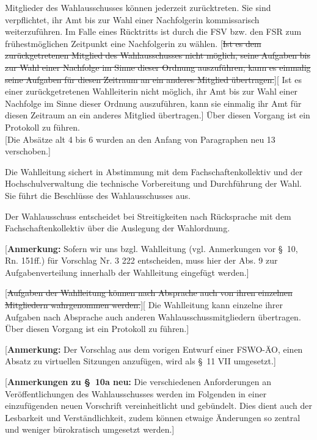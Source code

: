 \documentclass[%
draft,%
multilinesections%
]{fswo}
\newcommand\oldT[1]  {{\color{Gray}[\st{#1}]}}
\newcommand\newT[1]  {{\color{Green}[#1]}}
\newcommand\bemFr[1] {{\color{Red}[#1]}}
\newcommand\bemFe[1] {{\color{Cyan}[#1]}}
\newcommand\oldT[1]{}%
\newcommand\newT[1]{#1}
\newcommand\bemFr[1]{}%
\newcommand\bemFe[1]{}%
\newcommand\change[2]{\oldT{#1}\newT{#2}}
\begin{document}
\begin{contract}
Mitglieder des Wahlausschusses können jederzeit zurücktreten.
Sie sind verpflichtet, ihr Amt bis zur Wahl einer Nachfolgerin kommissarisch weiterzuführen.
Im Falle eines Rücktritts ist durch die FSV bzw. den FSR zum frühestmöglichen Zeitpunkt eine Nachfolgerin zu wählen.
\change{Ist es dem zurückgetretenen Mitglied des Wahlausschusses nicht möglich, seine Aufgaben bis zur Wahl einer Nachfolge im Sinne dieser Ordnung auszuführen, kann es einmalig seine Aufgaben für diesen Zeitraum an ein anderes Mitglied übertragen.}{%
Ist es einer zurückgetretenen Wahlleiterin nicht möglich, ihr Amt bis zur Wahl einer
Nachfolge im Sinne dieser Ordnung auszuführen, kann sie einmalig ihr Amt für diesen
Zeitraum an ein anderes Mitglied übertragen.}
Über diesen Vorgang ist ein Protokoll zu führen.
%
\\\bemFe{Die Absätze alt 4 bis 6 wurden an den Anfang von Paragraphen neu 13 verschoben.}

Die Wahlleitung sichert in Abstimmung mit dem Fachschaftenkollektiv und der Hochschulverwaltung die technische Vorbereitung und Durchführung der Wahl.
Sie führt die Beschlüsse des Wahlausschusses aus.

Der Wahlausschuss entscheidet bei Streitigkeiten nach Rücksprache mit dem Fachschaftenkollektiv über die Auslegung der Wahlordnung.
%
\begin{addmargin}{1cm}
\bemFr{\textbf{Anmerkung:} Sofern wir uns bzgl. Wahlleitung (vgl. Anmerkungen vor \S~10, Rn. 151ff.) für Vorschlag Nr. 3
222 entscheiden, muss hier der Abs. 9 zur Aufgabenverteilung innerhalb der Wahlleitung eingefügt werden.}
\end{addmargin}

\change{Aufgaben der Wahlleitung können nach Absprache auch von ihren einzelnen Mitgliedern wahrgenommen werden.}{%
Die Wahlleitung kann einzelne ihrer Aufgaben nach Absprache auch anderen Wahlausschussmitgliedern übertragen. Über diesen Vorgang ist ein Protokoll zu führen.}
%
\begin{addmargin}{1cm}
\bemFr{\textbf{Anmerkung:} Der Vorschlag aus dem vorigen Entwurf einer FSWO-ÄO, einen Absatz zu virtuellen Sitzungen anzufügen, wird als \S~11 VII umgesetzt.}
\end{addmargin}
\end{contract}

\bemFr{\textbf{Anmerkungen zu \S~10a neu:}
Die verschiedenen Anforderungen an Veröffentlichungen des Wahlausschusses werden im Folgenden in einer einzufügenden neuen Vorschrift vereinheitlicht und gebündelt.
Dies dient auch der Lesbarkeit und Verständlichkeit, zudem können etwaige Änderungen so zentral und weniger bürokratisch umgesetzt werden.}
\end{document}

